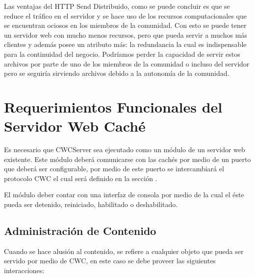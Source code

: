 Las ventajas del HTTP Send Distribuido, como se puede concluir es que se reduce el tráfico en el servidor y se hace uso de los recursos computacionales que se encuentran ociosos en los miembros de la comunidad. Con esto se puede tener un servidor web con mucho menos recursos, pero que pueda servir a muchos más clientes y además posee un atributo más: la redundancia la cual es indispensable para la continuidad del negocio. Podríamos perder la capacidad de servir estos archivos por parte de uno de los miembros de la comunidad o incluso del servidor pero se seguiría sirviendo archivos debido a la autonomía de la comunidad. 


\section{Requerimientos Funcionales del Servidor Web Caché}

Es necesario que CWCServer sea ejecutado como un módulo de un servidor web existente. Este módulo deberá comunicarse con las cachés por medio de un puerto que deberá ser configurable, por medio de este puerto se intercambiará el protocolo CWC el cual será definido en la sección \cite{protocolo_cwc}. 

El módulo deber contar con una interfaz de consola por medio de la cual el éste pueda ser detenido, reiniciado, habilitado o deshabilitado.

\subsection{Administración de Contenido}

Cuando se hace alusión al contenido, se refiere a cualquier objeto que pueda ser servido por medio de CWC, en este caso se debe proveer las siguientes interacciones:

